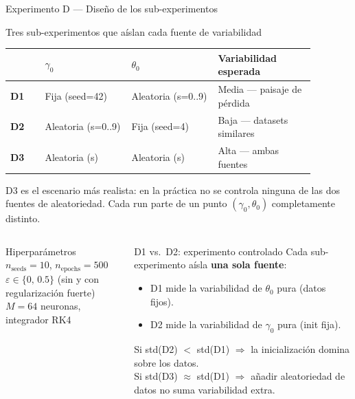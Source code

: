\documentclass[10pt]{beamer}
\begin{document}
\begin{frame}{Experimento D — Diseño de los sub-experimentos}

\begin{block}{Tres sub-experimentos que aíslan cada fuente de variabilidad}
\begin{tabular}{p{0.10\linewidth}p{0.25\linewidth}p{0.25\linewidth}p{0.28\linewidth}}
  \toprule
  & $\gamma_0$ & $\theta_0$ & Variabilidad esperada \\
  \midrule
  \textbf{D1} & Fija (seed=42) & Aleatoria (s=0..9) & Media — paisaje de pérdida \\[3pt]
  \textbf{D2} & Aleatoria (s=0..9) & Fija (seed=4) & Baja — datasets similares \\[3pt]
  \textbf{D3} & Aleatoria (s) & Aleatoria (s) & Alta — ambas fuentes \\
  \bottomrule
\end{tabular}
\end{block}

\medskip
D3 es el escenario más realista: en la práctica no se controla ninguna de las dos fuentes de aleatoriedad. Cada run parte de un punto $(\gamma_0, \theta_0)$ completamente distinto.

\bigskip
\begin{columns}
\begin{block}{Hiperparámetros}
  $n_\text{seeds} = 10$, $n_\text{epochs} = 500$\\
  $\varepsilon \in \{0,\, 0.5\}$ (sin y con regularización fuerte)\\
  $M = 64$ neuronas, integrador RK4
\end{block}
\begin{alertblock}{D1 vs.\ D2: experimento controlado}
  Cada sub-experimento aísla \textbf{una sola fuente}:
  \begin{itemize}\itemsep2pt
    \item D1 mide la variabilidad de $\theta_0$ pura (datos fijos).
    \item D2 mide la variabilidad de $\gamma_0$ pura (init fija).
  \end{itemize}
  \smallskip
  Si std(D2) $<$ std(D1) $\Rightarrow$ la inicialización domina sobre los datos.\\
  Si std(D3) $\approx$ std(D1) $\Rightarrow$ añadir aleatoriedad de datos no suma variabilidad extra.
\end{alertblock}
\end{columns}

\end{frame}
\end{document}

